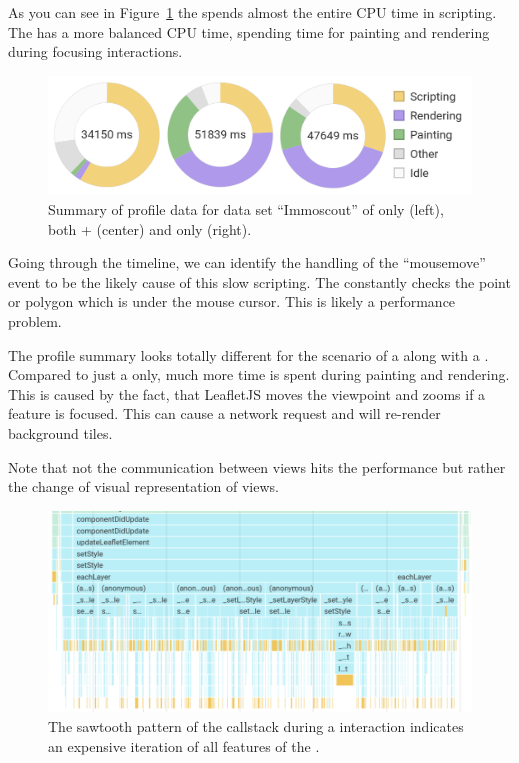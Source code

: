 As you can see in Figure~\ref{fig:evaluation:performance:profiling:immoscout:summary} the \tmap{} spends almost the entire CPU time in scripting.
The \gv{} has a more balanced CPU time, spending time for painting and rendering during focusing interactions.

\begin{figure}[ht]
  \centering
  \includegraphics[width=\textwidth]{figures/evaluation/performance/summaries/immoscout}
  \caption{
    Summary of profile data for data set ``Immoscout'' of \tmap{} only (left), both \tmap{} + \gv{} (center) and only \gv{} (right).
  }\label{fig:evaluation:performance:profiling:immoscout:summary}
\end{figure}

Going through the timeline, we can identify the handling of the ``mousemove'' event to be the likely cause of this slow scripting.
The \tmap{} constantly checks the point or polygon which is under the mouse cursor.
This is likely a performance problem.

The profile summary looks totally different for the scenario of a \tmap{} along with a \gvis{}.
Compared to just a \tmap{} only, much more time is spent during painting and rendering.
This is caused by the fact, that LeafletJS moves the viewpoint and zooms if a feature is focused.
This can cause a network request and will re-render background tiles.

Note that not the communication between views hits the performance but rather the change of visual representation of views.


\begin{figure}[ht]
  \centering
  \includegraphics[width=\textwidth]{figures/evaluation/performance/profiles/immoscout_geo_only/callstack}
  \caption{
    The sawtooth pattern of the callstack during a  interaction indicates an expensive iteration of all features of the .
  }\label{fig:evaluation:performance:profiling:immoscout_both:callstack}
\end{figure}


